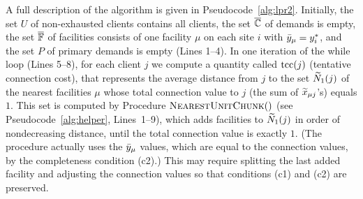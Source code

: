 \documentclass[oneside,final]{ucr}
\begin{document}
A full description of the algorithm is given in
Pseudocode~\ref{alg:lpr2}.  Initially, the set $U$ of
non-exhausted clients contains all clients, the set
$\overline{\mathbb{C}}$ of demands is empty, the set $\overline{\mathbb{F}}$ of
facilities consists of one facility $\mu$ on each site $i$
with ${\bar y}_\mu = y^\ast_i$, and the set $P$ of primary
demands is empty (Lines 1--4).  In one iteration of the
while loop (Lines 5--8), for each client $j$ we
compute a quantity called $\mbox{\rm{tcc}}(j)$ (tentative connection
cost), that represents the average distance from $j$ to the
set ${\widetilde N}_1(j)$ of the nearest facilities $\mu$ whose
total connection value to $j$ (the sum of ${\widetilde x}_{\mu
  j}$'s) equals $1$.  This set is computed by Procedure
${\textsc{NearestUnitChunk}}()$ (see Pseudocode~\ref{alg:helper},
Lines~1--9), which adds facilities to ${\widetilde N}_1(j)$ in
order of nondecreasing distance, until the total connection
value is exactly $1$. (The procedure actually uses the
${\bar y}_\mu$ values, which are equal to the connection values,
by the completeness condition (c2).)  This may require splitting the last added
facility and adjusting the connection values so that
conditions (c1) and (c2) are preserved.
\end{document}
